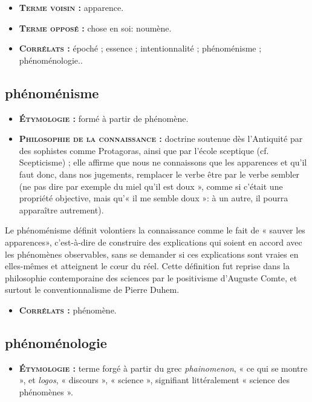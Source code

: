 \begin{itemize}[leftmargin=1cm, label=, itemsep=1pt]
\item {\bf \textsc{Terme voisin} :} apparence.
\item {\bf \textsc{Terme opposé} :} chose en soi: noumène.
\item {\bf \textsc{Corrélats} :} époché ; essence ; intentionnalité ;
phénoménisme ; phénoménologie..
\end{itemize}
 
\subsection{phénoménisme}
\begin{itemize}[leftmargin=1cm, label=, itemsep=1pt]
\item {\bf \textsc{Étymologie} :} formé à partir de
phénomène.
\item {\bf \textsc{Philosophie de la connaissance} :} doctrine soutenue
dès l'Antiquité par des sophistes
comme Protagoras, ainsi que par
l'école sceptique (cf. Scepticisme) ;
elle affirme que nous ne connaissons
que les apparences et qu'il faut
donc, dans nos jugements, remplacer
le verbe être par le verbe sembler
(ne pas dire par exemple du
miel qu’il est doux », comme si
c'était une propriété objective, mais
qu'« il me semble doux »: à un
autre, il pourra apparaître autrement).
\end{itemize}

Le phénoménisme définit volontiers la
connaissance comme le fait de « sauver
les apparences», c’est-à-dire de
construire des explications qui soient en
accord avec les phénomènes observables,
sans se demander si ces explications
sont vraies en elles-mêmes et
atteignent le cœur du réel. Cette définition
fut reprise dans la philosophie
contemporaine des sciences par le positivisme
d’Auguste Comte, et surtout le
conventionnalisme de Pierre Duhem.

\begin{itemize}[leftmargin=1cm, label=, itemsep=1pt]
\item {\bf \textsc{Corrélats} :} phénomène.
\end{itemize}

\subsection{phénoménologie}

\begin{itemize}[leftmargin=1cm, label=, itemsep=1pt]
\item {\bf \textsc{Étymologie} :} terme forgé à partir
du grec {\it phainomenon}, « ce qui se
montre », et {\it logos}, « discours »,
« science », signifiant littéralement
« science des phénomènes ».
\end{itemize}

